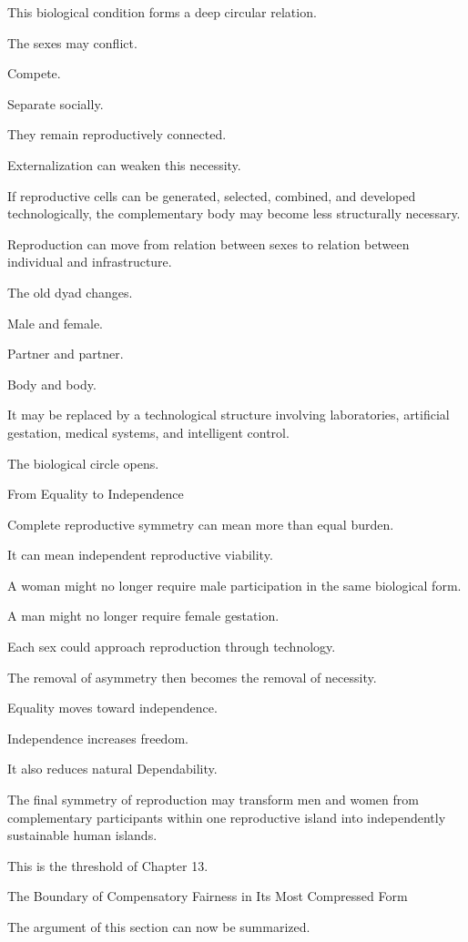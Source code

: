 This biological condition forms a deep circular relation.

The sexes may conflict.

Compete.

Separate socially.

They remain reproductively connected.

Externalization can weaken this necessity.

If reproductive cells can be generated, selected, combined, and developed technologically, the complementary body may become less structurally necessary.

Reproduction can move from relation between sexes to relation between individual and infrastructure.

The old dyad changes.

Male and female.

Partner and partner.

Body and body.

It may be replaced by a technological structure involving laboratories, artificial gestation, medical systems, and intelligent control.

The biological circle opens.

From Equality to Independence

Complete reproductive symmetry can mean more than equal burden.

It can mean independent reproductive viability.

A woman might no longer require male participation in the same biological form.

A man might no longer require female gestation.

Each sex could approach reproduction through technology.

The removal of asymmetry then becomes the removal of necessity.

Equality moves toward independence.

Independence increases freedom.

It also reduces natural Dependability.

The final symmetry of reproduction may transform men and women from complementary participants within one reproductive island into independently sustainable human islands.

This is the threshold of Chapter 13.

The Boundary of Compensatory Fairness in Its Most Compressed Form

The argument of this section can now be summarized.

